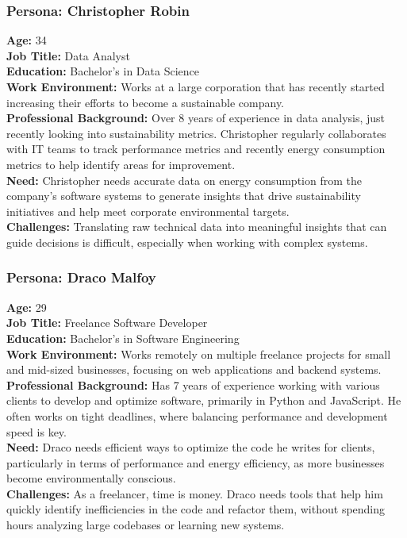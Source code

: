 \documentclass[12pt]{article}
\begin{document}
\subsubsection*{Persona: Christopher Robin}
\textbf{Age:} 34\\
\textbf{Job Title:} Data Analyst\\
\textbf{Education:} Bachelor's in Data Science\\[2mm]
\textbf{Work Environment:} Works at a large corporation that has recently started increasing their efforts to become a sustainable company.\\
\textbf{Professional Background:} Over 8 years of experience in data analysis, just recently looking into sustainability metrics. Christopher regularly collaborates with IT teams to track performance metrics and recently energy consumption metrics to help identify areas for improvement.\\[2mm]
\textbf{Need:} Christopher needs accurate data on energy consumption from the company's software systems to generate insights that drive sustainability initiatives and help meet corporate environmental targets.\\
\textbf{Challenges:} Translating raw technical data into meaningful insights that can guide decisions is difficult, especially when working with complex systems. 

\subsubsection*{Persona: Draco Malfoy}
\textbf{Age:} 29\\
\textbf{Job Title:} Freelance Software Developer\\
\textbf{Education:} Bachelor's in Software Engineering\\[2mm]
\textbf{Work Environment:} Works remotely on multiple freelance projects for small and mid-sized businesses, focusing on web applications and backend systems.\\
\textbf{Professional Background:} Has 7 years of experience working with various clients to develop and optimize software, primarily in Python and JavaScript. He often works on tight deadlines, where balancing performance and development speed is key.\\[2mm]
\textbf{Need:} Draco needs efficient ways to optimize the code he writes for clients, particularly in terms of performance and energy efficiency, as more businesses become environmentally conscious.\\
\textbf{Challenges:} As a freelancer, time is money. Draco needs tools that help him quickly identify inefficiencies in the code and refactor them, without spending hours analyzing large codebases or learning new systems.
\end{document}

